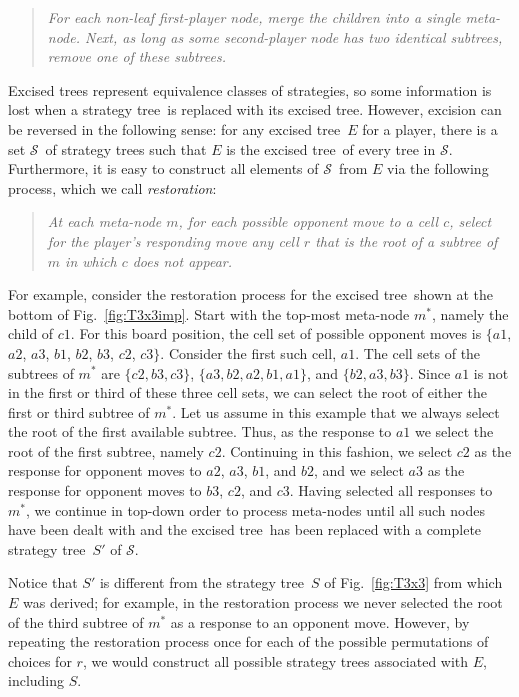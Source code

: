 \documentclass{llncs}
\def\stt{strategy tree}
\def\exct{excised tree}
\def\Exct{Excised tree}
\def\calS{\mbox{$\mathcal S$}}
\begin{document}
\begin{quotation}{\it
\noindent
For each non-leaf first-player node,
merge the children into a single meta-node. Next, 
as long as some second-player node has two identical subtrees,
remove one of these subtrees.
}\end{quotation}

\Exct s represent equivalence classes of strategies,
so some information is lost when a \stt\ is replaced with its \exct.
However, excision can be reversed in the following sense:
for any \exct\ $E$ for a player, 
there is a set \calS\ of \stt s 
such that $E$ is the \exct\ of every tree in \calS.
Furthermore, it is easy to construct all elements of \calS\ from $E$
via the following process, which we call {\it restoration}:

\begin{quotation}{\it
\noindent
At each meta-node $m$,
for each possible opponent move to a cell $c$,
select for the player's responding move any cell $r$
that is the root of a subtree of $m$ in which $c$ does not appear.
}\end{quotation}

For example, consider the restoration process
for the \exct\ shown at the bottom of Fig.~\ref{fig:T3x3imp}.
Start with the top-most meta-node $m^*$, namely the child of $c1$.
For this board position,
the cell set of possible opponent moves
is $\{a1$, $a2$, $a3$, $b1$, $b2$, $b3$, $c2$, $c3\}$.
Consider the first such cell, $a1$.
The cell sets of the subtrees of $m^*$ are 
$\{c2,b3,c3\}$,
$\{a3,b2,a2,b1,a1\}$, and
$\{b2,a3,b3\}$.
Since $a1$ is not in the first or third 
of these three cell sets, we can select
the root of either the first or third subtree of $m^*$.
Let us assume in this example that we always
select the root of the first available subtree.
Thus, as the response to $a1$ we select the root
of the first subtree, namely $c2$.
Continuing in this fashion, 
we select $c2$ as the response for
opponent moves to $a2$, $a3$, $b1$, and $b2$,
and we select $a3$ as the response for opponent moves
to $b3$, $c2$, and $c3$.
Having selected all responses to $m^*$,
we continue in top-down order to process meta-nodes
until all such nodes have been dealt with and the 
\exct\ has been replaced with a complete \stt\ $S'$ of \calS.

Notice that $S'$ is different from the \stt\ $S$
of Fig.~\ref{fig:T3x3} from which $E$ was derived;
for example, in the restoration process
we never selected the root of the third subtree of $m^*$
as a response to an opponent move.
However, by repeating the restoration process once for each
of the possible permutations of choices for $r$,
we would construct all possible \stt s associated with $E$,
including $S$.
\end{document}
